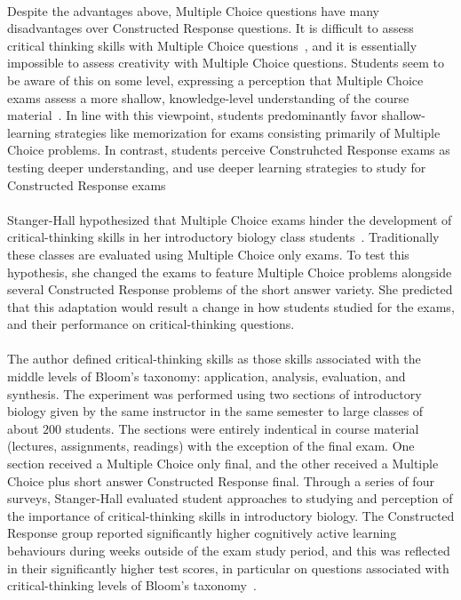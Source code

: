 \documentclass[12pt]{article}
\begin{document}
\paragraph{}
Despite the advantages above, Multiple Choice questions have many disadvantages over Constructed Response questions. It is difficult to assess critical thinking skills with Multiple Choice questions~\cite{martinez1999cognition}, and it is essentially impossible to assess creativity with Multiple Choice questions. Students seem to be aware of this on some level, expressing a perception that Multiple Choice exams assess a more shallow, knowledge-level understanding of the course material~\cite{scouller1998influence}. In line with this viewpoint, students predominantly favor shallow-learning strategies like memorization for exams consisting primarily of Multiple Choice problems. In contrast, students perceive Construhcted Response exams as testing deeper understanding, and use deeper learning strategies to study for Constructed Response exams~\cite{scouller1998influence}
\paragraph{}
Stanger-Hall hypothesized that Multiple Choice exams hinder the development of critical-thinking skills in her introductory biology class students~\cite{stanger2012multiple}. Traditionally these classes are evaluated using Multiple Choice only exams. To test this hypothesis, she changed the exams to feature Multiple Choice problems alongside several Constructed Response problems of the short answer variety. She predicted that this adaptation would result a change in how students studied for the exams, and their performance on critical-thinking questions.
\paragraph{}
The author defined critical-thinking skills as those skills associated with the middle levels of Bloom's taxonomy: application, analysis, evaluation, and synthesis. The experiment was performed using two sections of introductory biology given by the same instructor in the same semester to large classes of about $200$ students. The sections were entirely indentical in course material (lectures, assignments, readings) with the exception of the final exam. One section received a Multiple Choice only final, and the other received a Multiple Choice plus short answer Constructed Response final. Through a series of four surveys, Stanger-Hall evaluated student approaches to studying and perception of the importance of critical-thinking skills in introductory biology. The Constructed Response group reported significantly higher cognitively active learning behaviours during weeks outside of the exam study period, and this was reflected in their significantly higher test scores, in particular on questions associated with critical-thinking levels of Bloom's taxonomy~\cite{stanger2012multiple}.
\end{document}
